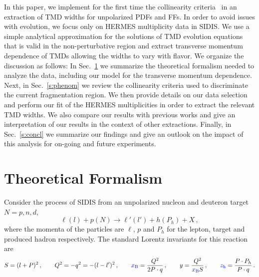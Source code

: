 \documentclass[final,3p,times,onecolumn,sort&compress,hidelinks]{elsarticle}
\newcommand{\xbj}{\ensuremath{{\cbl x_{\rm B}}}}
\newcommand{\zh}{\ensuremath{{\cbl z_{\rm h}}}}
\newcommand\3[1]{\boldsymbol{#1}}
\newcommand{\cbl}{\color{blue}}
\begin{document}

  
In this paper, we  implement for the first time the collinearity criteria~\cite{Boglione:2016bph} in an extraction of TMD widths for unpolarized PDFs and FFs.  In order to avoid issues with evolution, we focus only on HERMES multiplicity data in SIDIS.  We use a simple analytical approximation for the solutions of TMD evolution equations that is valid in the non-perturbative region and  extract transverse momentum dependence of TMDs allowing the widths to vary with flavor.
We organize the discussion as follows: In Sec.~\ref{s:model} we summarize the theoretical formalism needed to analyze the data, including our model for the transverse momentum dependence.  {\cbl Next, in Sec.~\ref{s:phenom} we review the collinearity criteria used to discriminate the current fragmentation region. We then provide details on our data selection and perform our} fit of the HERMES multiplicities in order to extract the relevant TMD widths.  We also compare our results with previous works and give an interpretation of our results in the context of  other extractions.  Finally, in Sec.~\ref{s:concl} we summarize our findings and give an outlook on the impact of this analysis for on-going and future experiments.



\section{Theoretical Formalism}
\label{s:model}
Consider the process of SIDIS from an unpolarized nucleon and deuteron target $N=p,n,d$,
\begin{equation}
\ell(l)+p(N)\to \ell'(l') + h(P_h) + X\,,
\end{equation}
where the momenta of the particles are  $\ell$, $p$ and $P_h$ for the lepton, target and produced hadron respectively.
 The standard Lorentz invariants for this reaction are
\begin{equation}
  S = (l+P)^2\,, \quad\quad Q^2 = -q^2 = -(l-l')^2\,, \quad\quad \xbj = \frac{Q^2} {2P\cdot q}\,, \quad\quad y = \frac{Q^2} {\xbj S}\,, \quad\quad
  \zh = \frac{P\cdot P_h} {P\cdot q}\,.
\end{equation}
\end{document}
